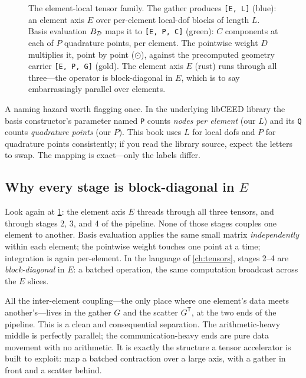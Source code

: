 \begin{figure}[t]
\caption[Anatomy of the element-local tensor]{The element-local tensor family.
The gather produces \lstinline[style=l4style]|[E, L]| (blue): an element axis $E$
over per-element local-dof blocks of length $L$. Basis evaluation
$B_{\mathcal{D}}$ maps it to \lstinline[style=l4style]|[E, P, C]| (green): $C$
components at each of $P$ quadrature points, per element. The pointwise weight
$D$ multiplies it, point by point ($\odot$), against the precomputed geometry
carrier \lstinline[style=l4style]|[E, P, G]| (gold). The element axis $E$ (rust)
runs through all three---the operator is block-diagonal in $E$, which is to say
embarrassingly parallel over elements.}
\label{fig:mf-anatomy}
\end{figure}

\begin{notationbox}
A naming hazard worth flagging once. In the underlying libCEED library the basis
constructor's parameter named \texttt{P} counts \emph{nodes per element} (our
$L$) and its \texttt{Q} counts \emph{quadrature points} (our $P$). This book uses
$L$ for local dofs and $P$ for quadrature points consistently; if you read the
library source, expect the letters to swap. The mapping is exact---only the
labels differ.
\end{notationbox}

\subsection{Why every stage is block-diagonal in \texorpdfstring{$E$}{E}}
\label{sec:mf-blockdiag}

Look again at \cref{fig:mf-anatomy}: the element axis $E$ threads through all
three tensors, and through stages 2, 3, and 4 of the pipeline. None of those
stages couples one element to another. Basis evaluation applies the same small
matrix \emph{independently} within each element; the pointwise weight touches one
point at a time; integration is again per-element. In the language of
\cref{ch:tensors}, stages 2--4 are \emph{block-diagonal} in $E$: a batched
operation, the same computation broadcast across the $E$ slices.

All the inter-element coupling---the only place where one element's data meets
another's---lives in the gather $G$ and the scatter $G^{\mathsf T}$, at the two
ends of the pipeline. This is a clean and consequential separation. The
arithmetic-heavy middle is perfectly parallel; the communication-heavy ends are
pure data movement with no arithmetic. It is exactly the structure a tensor
accelerator is built to exploit: map a batched contraction over a large axis,
with a gather in front and a scatter behind.

